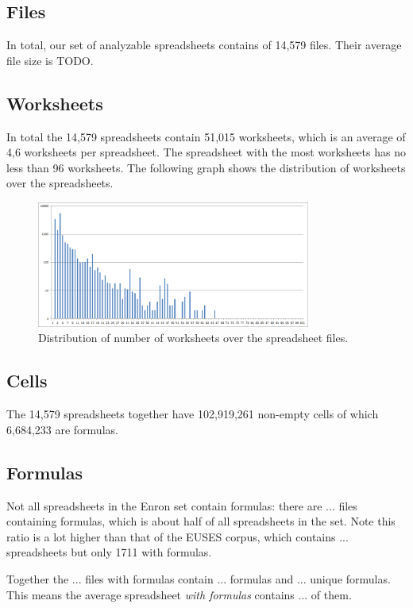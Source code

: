 \documentclass[conference]{IEEEtran}
\begin{document}
\subsection{Files}
In total, our set of analyzable spreadsheets contains of 14,579 files. Their average file size is TODO.

\subsection{Worksheets}
In total the 14,579 spreadsheets contain 51,015 worksheets, which is an average of 4,6 worksheets per spreadsheet. The spreadsheet with the most worksheets has no less than 96 worksheets. The following graph shows the distribution of worksheets over the spreadsheets.

\begin{figure}[ht!]
\centering
\includegraphics[width=90mm]{figures/Worksheets.png}
\caption{Distribution of number of worksheets over the spreadsheet files.}
\label{overflow}
\end{figure}

\subsection{Cells}
The 14,579 spreadsheets together have 102,919,261 non-empty cells of which 6,684,233 are formulas.

\subsection{Formulas}
Not all spreadsheets in the Enron set contain formulas: there are ... files containing formulas, which is about half of all spreadsheets in the set. Note this ratio is a lot higher than that of the EUSES corpus, which contains ... spreadsheets but only 1711 with formulas.

Together the ... files with formulas contain ... formulas and ... unique formulas. This means the average spreadsheet \emph{with formulas} contains ... of them.
\end{document}
